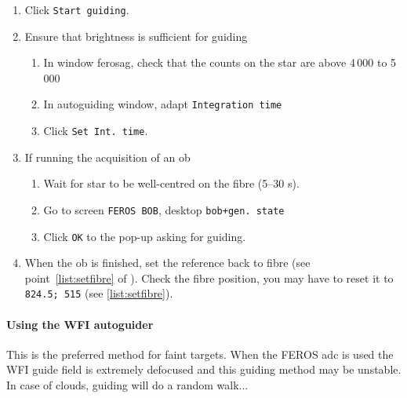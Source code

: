\documentclass[11pt,fleqn,a4paper]{book}
\begin{document}
\begin{enumerate}
    \begin{enumerate}
        \item Click \texttt{Set reference}
        \item In window \gls{pickrefstar}, under \texttt{Select 'pick' mode} select \texttt{Pick Object}
        \item In window \gls{ferosag}, click on star
    \end{enumerate} 
    \item Click \texttt{Start guiding}.
    \item Ensure that brightness is sufficient for guiding
    \begin{enumerate}
        \item In window \gls{ferosag}, check that the counts on the star are above 4\,000 to 5\,000
        \item In \gls{autoguiding} window, adapt \texttt{Integration time}
        \item Click \texttt{Set Int. time}. 
    \end{enumerate}
    \item If running the \gls{acquisition} of an \gls{ob}
    \begin{enumerate}
        \item Wait for star to be well-centred on the fibre (5--30 s).
        \item Go to screen \texttt{FEROS BOB}, \gls{desktop} \texttt{bob+gen. state}
        \item Click \texttt{OK} to the pop-up asking for guiding.
    \end{enumerate}
    \item When the \gls{ob} is finished, set the reference back to fibre
          (see point~\ref{list:setfibre} of ). Check the fibre position, you may have to reset it to \texttt{824.5; 515} (see \ref{list:setfibre}). 
\end{enumerate}

\paragraph{Using the WFI autoguider}

This is the preferred method for faint targets.  When the FEROS \gls{adc} is used the WFI guide field is extremely defocused and this guiding method may be unstable.  In case of clouds, guiding will do a random walk...
\end{document}
